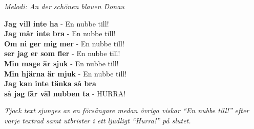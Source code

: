 {\footnotesize\textit{Melodi: An der schönen blauen Donau}}\par
\vspace{10pt}
\textbf{Jag vill inte ha} - En nubbe till!\\
\textbf{Jag mår inte bra} - En nubbe till!\\
\textbf{Om ni ger mig mer} - En nubbe till!\\
\textbf{ser jag er som fler} - En nubbe till!\\
\textbf{Min mage är sjuk} - En nubbe till!\\
\textbf{Min hjärna är mjuk} - En nubbe till!\\
\textbf{Jag kan inte tänka så bra}\\
\textbf{så jag får väl nubben ta} - HURRA!\par
\vspace{10pt}
{\footnotesize\textit{Tjock text sjunges av en försångare medan övriga viskar ``En nubbe till!'' efter varje textrad samt utbrister i ett ljudligt ``Hurra!'' på slutet.}}
